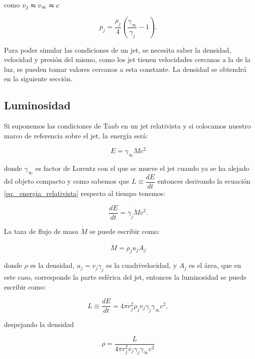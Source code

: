 \documentclass[12pt,a4paper]{book}
\begin{document}
\noindent como $v_j \thickapprox v_\infty \thickapprox c$

\begin{equation}
  p_j = \frac{\rho_j}{4}\left( \frac{\gamma_\infty}{\gamma_j}-1\right).
\end{equation}

Para poder simular las condiciones de un jet, se necesita saber la densidad, velocidad y presión del mismo, como los jet tienen velocidades cercanas a la
de la luz, se pueden tomar valores cercanos a esta constante. La densidad se obtendrá en la siguiente sección. 


\subsection{Luminosidad}
Si suponemos las condiciones de Taub en un jet relativista y si colocamos nuestro marco de referencia sobre el jet, la energía será:

\begin{equation} \label{eq._energia_relativista}
  E = \gamma_{\infty} M c^2
\end{equation}

\noindent donde $\gamma_{\infty}$ es factor de Lorentz con el que se mueve el jet cuando ya se ha alejado del objeto compacto y como sabemos 
que $L \equiv \dfrac{d E}{d t}$ entonces derivando la ecuación \ref{eq._energia_relativista} respecto al tiempo tenemos:

\begin{equation} \label{eq._luminosidad_relativista}
  \dfrac{d E}{d t} = \gamma_{j} \dot{ M }  c^2.
\end{equation}

La taza de flujo de masa $\dot{M}$ se puede escribir como:

\begin{equation}
  \dot{M} = \rho_j u_j A_j
\end{equation}

\noindent donde $\rho$ es la densidad, $u_j = v_j \gamma_{j}$ es la cuadrivelocidad,  y $A_j$ es el área, que en este caso, corresponde la parte esférica del jet, entonces la luminosidad se puede escribir como:

\begin{equation}
  L \equiv \dfrac{d E}{d t} = 4\pi r_j^2 \rho_j v_j \gamma_j \gamma_{\infty} c^2,
\end{equation}

\noindent despejando la densidad

\begin{equation}
  \rho = \frac{L}{4\pi r_j^2 v_j \gamma_j \gamma_{\infty} c^2}
\end{equation}
\end{document}
